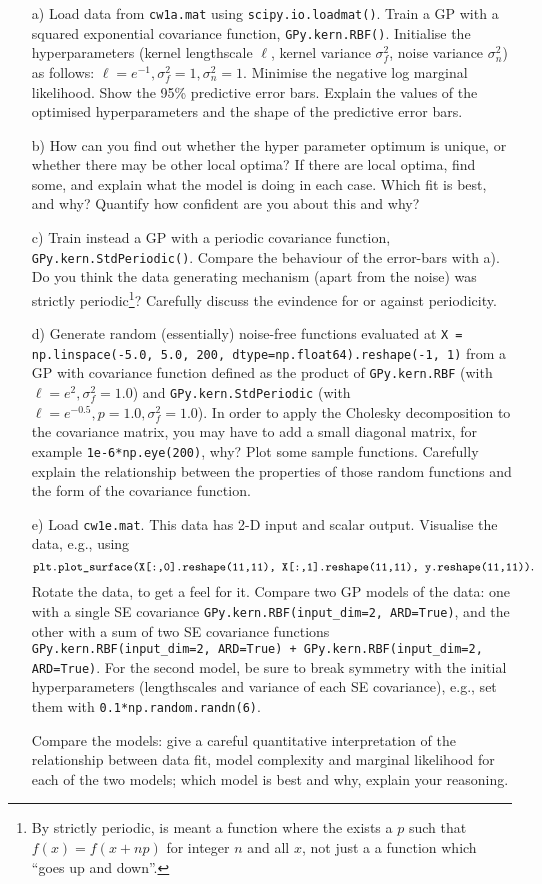 \documentclass[12pt]{article}
\begin{document}
\begin{enumerate}

\item[a)] Load data from \texttt{cw1a.mat} using \texttt{scipy.io.loadmat()}. Train a GP with a
  squared exponential covariance function, \texttt{GPy.kern.RBF()}. Initialise the hyperparameters (kernel lengthscale $\ell$, kernel variance $\sigma_f^2$, noise variance $\sigma_n^2$) as follows: $\ell = e^{-1}, \sigma_f^2=1, \sigma_n^2=1$. Minimise the negative log marginal likelihood. Show the 95\%
  predictive error bars. Explain the values of the optimised
  hyperparameters and the shape of the predictive error bars.

\item[b)] How can you find out whether the hyper parameter optimum is
  unique, or whether there may be other local optima? If there are
  local optima, find some, and explain what the model is doing in each
  case. Which fit is best, and why? Quantify how confident are you about this and why?

\item[c)] Train instead a GP with a periodic covariance
  function, \texttt{GPy.kern.StdPeriodic()}. Compare the behaviour of the error-bars with a). Do you
  think the data generating mechanism (apart from the noise) was
  strictly periodic\footnote{By strictly periodic, is meant a
    function where the exists a $p$ such that $f(x)=f(x+np)$ for
    integer $n$ and all
    $x$, not just a a function which ``goes up and down''.}? Carefully
  discuss the evindence for or against periodicity.  
  
\item[d)] Generate random (essentially) noise-free functions evaluated
  at \texttt{X = np.linspace(-5.0, 5.0, 200, dtype=np.float64).reshape(-1, 1)} from a GP with covariance function defined as the product of \texttt{GPy.kern.RBF} (with $\ell = e^2, \sigma_f^2 = 1.0$) and \texttt{GPy.kern.StdPeriodic} (with $\ell = e^{-0.5}, p=1.0, \sigma_f^2 = 1.0$). In order to apply the Cholesky
  decomposition to the covariance matrix, you may have to add a small
  diagonal matrix, for example \texttt{1e-6*np.eye(200)}, why?  Plot some
  sample functions. Carefully explain the relationship between the
  properties of those random functions and the form of the covariance
  function.

\item[e)] Load \texttt{cw1e.mat}. This data has 2-D input and
  scalar output. Visualise the data, e.g., using
  $${\small\texttt{plt.plot\_surface(X[:,0].reshape(11,11),
                 X[:,1].reshape(11,11),
                 y.reshape(11,11))}}.$$
  Rotate the data, to get a feel for it. Compare two GP models of the data: one with a single SE covariance \texttt{GPy.kern.RBF(input\_dim=2, ARD=True)}, and the other with a sum of two SE covariance functions \texttt{GPy.kern.RBF(input\_dim=2, ARD=True) + GPy.kern.RBF(input\_dim=2, ARD=True)}.
  For the second model, be sure to break symmetry with the initial hyperparameters (lengthscales and variance of each SE covariance), e.g., set them with \texttt{0.1*np.random.randn(6)}. 

  Compare the models: give a careful quantitative interpretation of
  the relationship between data fit, model complexity and marginal
  likelihood for each of the two models; which model is best and why,
  explain your reasoning.

\end{enumerate}
\end{document}
